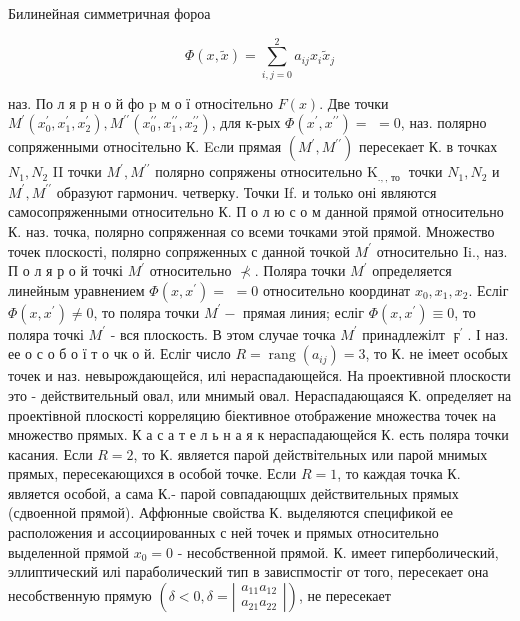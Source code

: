 \documentclass[10pt]{article}
\begin{document}
Билинейная симметричная фороа



\[

\Phi(x, \tilde{x})=\sum_{i, j=0}^{2} a_{i j} x_{i} \tilde{x}_{j}

\]



наз. По л я р н о й фо $\mathrm{p}$ м о ї относітельно $F(x)$. Две точки $M^{\prime}\left(x_{0}^{\prime}, x_{1}^{\prime}, x_{2}^{\prime}\right), M^{\prime \prime}\left(x_{0}^{\prime \prime}, x_{1}^{\prime \prime}, x_{2}^{\prime \prime}\right)$, для к-рых $\Phi\left(x^{\prime}, x^{\prime \prime}\right)=$ $=0$, наз. полярно сопряженными относітельно К. Ecли прямая $\left(M^{\prime}, M^{\prime \prime}\right)$ пересекает $К$. в точках $N_{1}, N_{2}$ II точки $M^{\prime}, M^{\prime \prime}$ полярно сопряжены относительно $\mathrm{K}_{., \text {, то }}$ точки $N_{1}, N_{2}$ и $M^{\prime}, M^{\prime \prime}$ образуют гармонич. четверку. Точки If. и только оні являются самосопряженными относительно К. П о л ю с о м данной прямой относительно К. наз. точка, полярно сопряженная со всеми точками этой прямой. Множество точек плоскості, полярно сопряженных с данной точкой $M^{\prime}$ относительно Ii., наз. П о л я р о й точкі $M^{\prime}$ относительно $\nprec$. Поляра точки $M^{\prime}$ определяется линейным уравнением $\Phi\left(x, x^{\prime}\right)=$ $=0$ относительно координат $x_{0}, x_{1}, x_{2}$. Есліг $\Phi\left(x, x^{\prime}\right) \neq 0$, то поляра точки $M^{\prime}-$ прямая линия; есліг $\Phi\left(x, x^{\prime}\right) \equiv 0$, то поляра точкі $M^{\prime}$ - вся плоскость. В этом случае точка $M^{\prime}$ принадлежілт $\digamma^{\prime}$. І наз. ее о с о б о ї т о чк о й. Есліг число $R=\operatorname{rang}\left(a_{i j}\right)=3$, то К. не імеет особых точек и наз. невырождающейся, илі нераспадающейся. На проективной плоскости это - действительный овал, или мнимый овал. Нераспадающаяся К. определяет на проектівной плоскості корреляцию біективное отображение множества точек на множество прямых. К а с а т е л ь н а я к нераспадающейся К. есть поляра точки касания. Если $R=2$, то К. является парой действітельных или парой мнимых прямых, пересекающихся в особой точке. Если $R=1$, то каждая точка К. является особой, а сама К.- парой совпадающшх действительных прямых (сдвоенной прямой). Аффюнные свойства К. выделяются спецификой ее расположения и ассоциированных с ней точек и прямых относительно выделенной прямой $x_{0}=0$ - несобственной прямой. К. имеет гиперболический, эллиптический илі параболический тип в зависпмостіг от того, пересекает она несобственную прямую $\left(\delta<0, \delta=\left|\begin{array}{l}a_{11} a_{12} \\ a_{21} a_{22}\end{array}\right|\right)$, не пересекает
\end{document}
